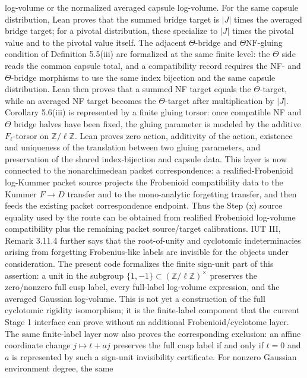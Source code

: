 \documentclass[11pt]{article}
\newcommand{\IUT}{IUT}
\newcommand{\Lean}{Lean}
\theoremstyle{plain}
\theoremstyle{definition}
\theoremstyle{remark}
\begin{document}
log-volume or the normalized averaged capsule log-volume.  For the same
capsule distribution, \Lean{} proves that the summed bridge target is
\(|J|\) times the averaged bridge target; for a pivotal distribution, these
specialize to \(|J|\) times the pivotal value and to the pivotal value itself.
The adjacent \(\Theta\)-bridge and \(\Theta\mathrm{NF}\)-gluing condition of
Definition 5.5(iii) are formalized at the same finite level: the \(\Theta\)
side reads the common capsule total, and a compatibility record requires the
NF- and \(\Theta\)-bridge morphisms to use the same index bijection and the
same capsule distribution.  Lean then proves that a summed NF target equals
the \(\Theta\)-target, while an averaged NF target becomes the \(\Theta\)-target
after multiplication by \(|J|\).
Corollary 5.6(iii) is represented by a finite gluing torsor: once compatible
NF and \(\Theta\) bridge halves have been fixed, the gluing parameter is modeled
by the additive \(F_\ell\)-torsor on \(\mathbb{Z}/\ell\mathbb{Z}\).  Lean proves
zero action, additivity of the action, existence and uniqueness of the
translation between two gluing parameters, and preservation of the shared
index-bijection and capsule data.
This layer is now connected to the nonarchimedean packet correspondence:
a realified-Frobenioid log-Kummer packet source projects the Frobenioid
compatibility data to the Kummer \(F\to D\) transfer and to the
mono-analytic forgetting transfer, and then feeds the existing packet
correspondence endpoint.  Thus the Step (x) source equality used by the route
can be obtained from realified Frobenioid log-volume compatibility plus the
remaining packet source/target calibrations.
\IUT{} III, Remark 3.11.4 further says that the root-of-unity and cyclotomic
indeterminacies arising from forgetting Frobenius-like labels are invisible
for the objects under consideration.  The present code formalizes the finite
sign-unit part of this assertion: a unit in the subgroup \(\{1,-1\}\subset
(\mathbb{Z}/\ell\mathbb{Z})^\times\) preserves the zero/nonzero full cusp
label, every full-label log-volume expression, and the averaged Gaussian
log-volume.  This is not yet a construction of the full cyclotomic rigidity
isomorphism; it is the finite-label component that the current Stage 1
interface can prove without an additional Frobenioid/cyclotome layer.
The same finite-label layer now also proves the corresponding exclusion:
an affine coordinate change \(j\mapsto t+a j\) preserves the full cusp label
if and only if \(t=0\) and \(a\) is represented by such a sign-unit
invisibility certificate.  For nonzero Gaussian environment degree, the same
\end{document}
